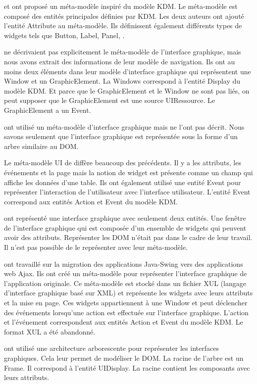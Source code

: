\documentclass[a4paper]{article}
\begin{document}
\citet{Gott16a} et \citet{Sanc14a} ont proposé un méta-modèle inspiré du modèle KDM.
Le méta-modèle est composé des entités principales définies par KDM.
Les deux auteurs ont ajouté l'entité Attribute au méta-modèle.
Ils définissent également différents types de widgets tels que Button, Label, Panel, \etc.

\citet{Fleu07b} ne décrivaient pas explicitement le méta-modèle de l'interface graphique,
  mais nous avons extrait des informations de leur modèle de navigation.
Ils ont au moins deux éléments dans leur modèle d'interface graphique qui représentent une Window
    et un GraphicElement.
La Windows correspond à l'entité Display du modèle KDM.
Et parce que le GraphicElement et le Window ne sont pas liés,
    on peut supposer que le GraphicElement est une source UIRessource.
Le GraphicElement a un Event.

\citet{Morg11a} ont utilisé un méta-modèle d'interface graphique mais ne l'ont pas décrit.
Nous savons seulement que l'interface graphique est représentée sous la forme d'un arbre similaire au DOM.

Le méta-modèle UI de \citet{Garce17b} diffère beaucoup des précédents.
Il y a les attributs, les événements et la page mais la notion de widget est présente comme un champ qui affiche les données d'une table.
Ils ont également utilisé une entité Event pour représenter l'interaction de l'utilisateur avec l'interface utilisateur.
L'entité Event correspond aux entités Action et Event du modèle KDM.

\citet{Memo03b} ont représenté une interface graphique avec seulement deux entités.
Une fenêtre de l'interface graphique qui est composée d'un ensemble de widgets qui peuvent avoir des attributs.
Représenter les DOM n'était pas dans le cadre de leur travail.
Il n'est pas possible de le représenter avec leur méta-modèle.

\citet{Sami07a} ont travaillé sur la migration des applications Java-Swing vers des applications web Ajax.
Ils ont créé un méta-modèle pour représenter l'interface graphique de l'application originale.
Ce méta-modèle est stocké dans un fichier XUL (langage d'interface graphique basé sur XML) et représente
  les widgets avec leurs attributs et la mise en page.
Ces widgets appartiennent à une Window et
  peut déclencher des événements lorsqu'une action est effectuée sur l'interface graphique.
L'action et l'événement correspondent aux entités Action et Event du modèle KDM.
Le format XUL a été abandonné.

\citet{Shah11b} ont utilisé une architecture arborescente pour représenter les interfaces graphiques.
Cela leur permet de modéliser le DOM.
La racine de l'arbre est un Frame.
Il correspond à l'entité UIDisplay.
La racine contient les composants avec leurs attributs.
\end{document}

